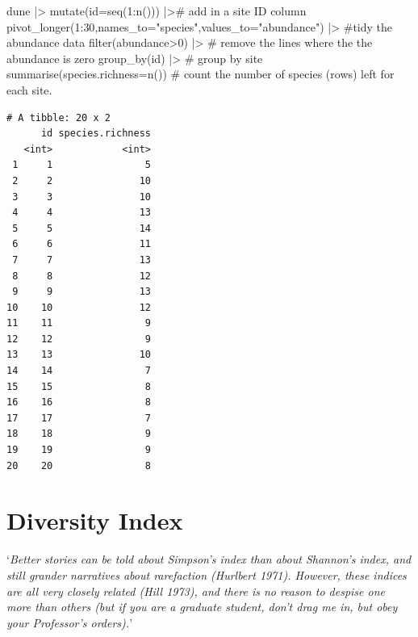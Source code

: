 \documentclass[
  letterpaper,
  DIV=11,
  numbers=noendperiod]{scrreprt}
\newenvironment{Shaded}{\begin{snugshade}}{\end{snugshade}}
\newcommand{\AttributeTok}[1]{\textcolor[rgb]{0.40,0.45,0.13}{#1}}
\newcommand{\CommentTok}[1]{\textcolor[rgb]{0.37,0.37,0.37}{#1}}
\newcommand{\DecValTok}[1]{\textcolor[rgb]{0.68,0.00,0.00}{#1}}
\newcommand{\FunctionTok}[1]{\textcolor[rgb]{0.28,0.35,0.67}{#1}}
\newcommand{\NormalTok}[1]{\textcolor[rgb]{0.00,0.23,0.31}{#1}}
\newcommand{\SpecialCharTok}[1]{\textcolor[rgb]{0.37,0.37,0.37}{#1}}
\newcommand{\StringTok}[1]{\textcolor[rgb]{0.13,0.47,0.30}{#1}}
\begin{document}
\begin{Shaded}
\begin{Highlighting}[]
\NormalTok{dune }\SpecialCharTok{|\textgreater{}}
  \FunctionTok{mutate}\NormalTok{(}\AttributeTok{id=}\FunctionTok{seq}\NormalTok{(}\DecValTok{1}\SpecialCharTok{:}\FunctionTok{n}\NormalTok{())) }\SpecialCharTok{|\textgreater{}}\CommentTok{\# add in a site ID column}
  \FunctionTok{pivot\_longer}\NormalTok{(}\DecValTok{1}\SpecialCharTok{:}\DecValTok{30}\NormalTok{,}\AttributeTok{names\_to=}\StringTok{"species"}\NormalTok{,}\AttributeTok{values\_to=}\StringTok{"abundance"}\NormalTok{) }\SpecialCharTok{|\textgreater{}} \CommentTok{\#tidy the abundance data}
  \FunctionTok{filter}\NormalTok{(abundance}\SpecialCharTok{\textgreater{}}\DecValTok{0}\NormalTok{) }\SpecialCharTok{|\textgreater{}} \CommentTok{\# remove the lines where the the abundance is zero}
  \FunctionTok{group\_by}\NormalTok{(id) }\SpecialCharTok{|\textgreater{}} \CommentTok{\# group by site}
  \FunctionTok{summarise}\NormalTok{(}\AttributeTok{species.richness=}\FunctionTok{n}\NormalTok{()) }\CommentTok{\# count the number of species (rows) left for each site.}
\end{Highlighting}
\end{Shaded}

\begin{verbatim}
# A tibble: 20 x 2
      id species.richness
   <int>            <int>
 1     1                5
 2     2               10
 3     3               10
 4     4               13
 5     5               14
 6     6               11
 7     7               13
 8     8               12
 9     9               13
10    10               12
11    11                9
12    12                9
13    13               10
14    14                7
15    15                8
16    16                8
17    17                7
18    18                9
19    19                9
20    20                8
\end{verbatim}

\section{Diversity Index}\label{diversity-index}

`\emph{Better stories can be told about Simpson's index than about
Shannon's index, and still grander narratives about rarefaction
(Hurlbert 1971). However, these indices are all very closely related
(Hill 1973), and there is no reason to despise one more than others (but
if you are a graduate student, don't drag me in, but obey your
Professor's orders).}'
\end{document}
